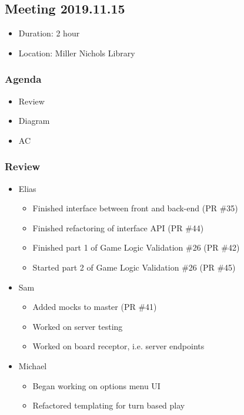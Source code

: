 \documentclass[11pt]{article}
\begin{document}
\subsection{Meeting 2019.11.15}
\label{sec:org850903b}
\begin{itemize}
\item Duration: 2 hour
\item Location: Miller Nichols Library
\end{itemize}
\subsubsection{Agenda}
\label{sec:org65db46c}
\begin{itemize}
\item Review
\item Diagram
\item AC
\end{itemize}
\subsubsection{Review}
\label{sec:org31616f0}
\begin{itemize}
\item Elias
\begin{itemize}
\item Finished interface between front and back-end (PR \#35)
\item Finished refactoring of interface API (PR \#44)
\item Finished part 1 of Game Logic Validation \#26 (PR \#42)
\item Started part 2 of Game Logic Validation \#26 (PR \#45)
\end{itemize}
\item Sam
\begin{itemize}
\item Added mocks to master (PR \#41)
\item Worked on server testing
\item Worked on board receptor, i.e. server endpoints
\end{itemize}
\item Michael 
\begin{itemize}
\item Began working on options menu UI
\item Refactored templating for turn based play
\end{itemize}
\end{itemize}
\end{document}
